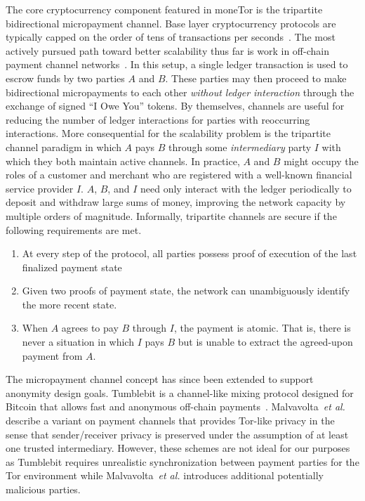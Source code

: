 The core cryptocurrency component featured in moneTor is the tripartite
bidirectional micropayment channel. Base layer cryptocurrency protocols are
typically capped on the order of tens of transactions per
seconds~\cite{team2018blockchain}. The most actively pursued path toward better
scalability thus far is work in off-chain payment channel
networks~\cite{poon2016bitcoin}. In this setup, a single ledger transaction is
used to escrow funds by two parties $A$ and $B$. These parties may then proceed
to make bidirectional micropayments to each other \emph{without ledger
  interaction} through the exchange of signed ``I Owe You'' tokens. By
themselves, channels are useful for reducing the number of ledger interactions
for parties with reoccurring interactions. More consequential for the
scalability problem is the tripartite channel paradigm in which $A$ pays $B$
through some \emph{intermediary} party $I$ with which they both maintain active
channels. In practice, $A$ and $B$ might occupy the roles of a customer and
merchant who are registered with a well-known financial service provider $I$.
$A$, $B$, and $I$ need only interact with the ledger periodically to deposit and
withdraw large sums of money, improving the network capacity by multiple orders
of magnitude. Informally, tripartite channels are secure if the following
requirements are met.

\begin{enumerate}
\item At every step of the protocol, all parties possess proof of execution of
  the last finalized payment state
\item Given two proofs of payment state, the network can unambiguously identify
  the more recent state.
\item When $A$ agrees to pay $B$ through $I$, the payment is atomic. That is,
  there is never a situation in which $I$ pays $B$ but is unable to extract the
  agreed-upon payment from $A$.
\end{enumerate}


The micropayment channel concept has since been extended to support anonymity
design goals. Tumblebit is a channel-like mixing protocol designed for Bitcoin
that allows fast and anonymous off-chain payments~\cite{heilman2017tumblebit}.
Malvavolta~\textit{et al.}~\cite{malavolta2017concurrency} describe a variant on
payment channels that provides Tor-like privacy in the sense that
sender/receiver privacy is preserved under the assumption of at least one
trusted intermediary. However, these schemes are not ideal for our purposes as
Tumblebit requires unrealistic synchronization between payment parties for the
Tor environment while Malvavolta~\textit{et al.} introduces additional
potentially malicious parties.

